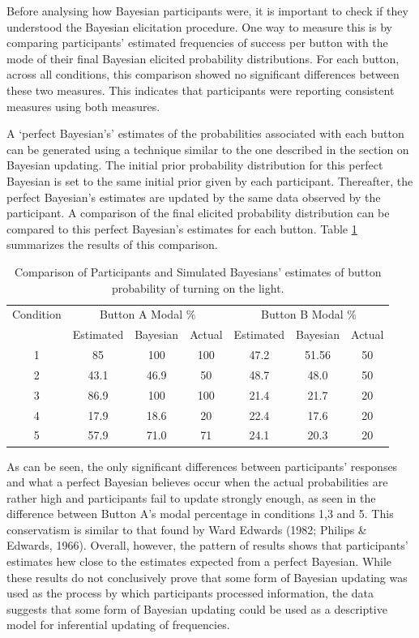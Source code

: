 \documentclass[USenglish,letterpaper,12pt,extrafontsizes,oneside,onecolumn,final]{memoir}
\begin{document}
Before analysing how Bayesian participants were, it is important to check if they understood the Bayesian elicitation procedure.  One way to measure this is by comparing participants' estimated frequencies of success per button with the mode of their final Bayesian elicited probability distributions.  For each button, across all conditions, this comparison showed no significant differences between these two measures.  This indicates that participants were reporting consistent measures using both measures.  

A `perfect Bayesian's' estimates of the probabilities associated with each button can be generated using a technique similar to the one described in the section on Bayesian updating.  The initial prior probability distribution for this perfect Bayesian is set to the same initial prior given by each participant. Thereafter, the perfect Bayesian's estimates are updated by the same data observed by the participant.  A comparison of the final elicited probability distribution can be compared to this perfect Bayesian's estimates for each button.  Table \ref{tab:Bayesian comparison} summarizes the results of this comparison.

\begin{table}[t]
\begin{tabular}{ccccccc}
\toprule
Condition & \multicolumn{3}{c}{Button A Modal \%} & \multicolumn{3}{c}{Button B Modal \%} \\ 
 &  Estimated & Bayesian & Actual & Estimated  & Bayesian & Actual \\ 
\midrule
1 & 85   & 100  & 100 & 47.2 & 51.56 & 50 \\ 
2 & 43.1 & 46.9 & 50  & 48.7 & 48.0  & 50 \\ 
3 & 86.9 & 100  & 100 & 21.4 & 21.7  & 20 \\ 
4 & 17.9 & 18.6 & 20  & 22.4 & 17.6  & 20 \\ 
5 & 57.9 & 71.0 & 71  & 24.1 & 20.3  & 20 \\ 
\bottomrule
\end{tabular} 
\caption{Comparison of Participants and Simulated Bayesians' estimates of button probability of turning on the light.\label{tab:Bayesian comparison}}
\end{table}

As can be seen, the only significant differences between participants' responses and what a perfect Bayesian believes occur when the actual probabilities are rather high and participants fail to update strongly enough, as seen in the difference between Button A's modal percentage in conditions 1,3 and 5.  This conservatism is similar to that found by Ward Edwards (1982; Philips \& Edwards, 1966).  Overall, however, the pattern of results shows that participants' estimates hew close to the estimates expected from a perfect Bayesian.  While these results do not conclusively prove that some form of Bayesian updating was used as the process by which participants processed information, the data suggests that some form of Bayesian updating could be used as a descriptive model for inferential updating of frequencies.
\end{document}
